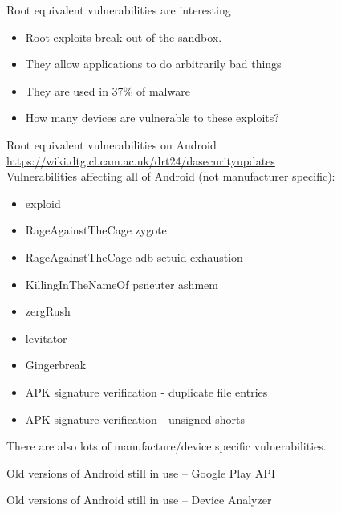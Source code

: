 \documentclass{beamer}
\begin{document}
\begin{frame}{Root equivalent vulnerabilities are interesting}{}
 \begin{itemize}
  \item Root exploits break out of the sandbox.
  \note{}
  \item They allow applications to do arbitrarily bad things
  \item They are used in 37\% of malware %
  \item How many devices are vulnerable to these exploits?
 \end{itemize}
\end{frame}

\begin{frame}{Root equivalent vulnerabilities on Android}{}
\small \url{https://wiki.dtg.cl.cam.ac.uk/drt24/dasecurityupdates}\\
Vulnerabilities affecting all of Android (not manufacturer specific):
 \begin{itemize}
  \item exploid
  \item RageAgainstTheCage zygote
  \item RageAgainstTheCage adb setuid exhaustion
  \item KillingInTheNameOf psneuter ashmem
  \item zergRush
  \item levitator
  \item Gingerbreak
  \item APK signature verification - duplicate file entries
  \item APK signature verification - unsigned shorts
 \end{itemize}
There are also lots of manufacture/device specific vulnerabilities.
\end{frame}

\begin{frame}{Old versions of Android still in use -- Google Play API}{}
 \begin{center}
 \end{center}
\end{frame}

\begin{frame}{Old versions of Android still in use -- Device Analyzer}{}
 \begin{center}
 \end{center}
\end{frame}
\end{document}
